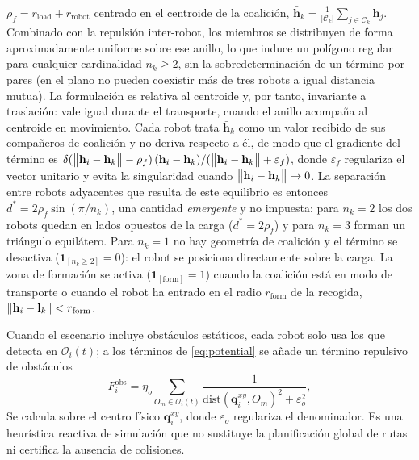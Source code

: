 $\rho_f = r_{\text{load}} + r_{\text{robot}}$ centrado en el centroide de la coalición,
$\bar{\mathbf{h}}_k = \tfrac{1}{|\mathcal{C}_k|}\sum_{j\in\mathcal{C}_k}\mathbf{h}_j$.
Combinado con la repulsión inter-robot, los miembros se distribuyen de forma
aproximadamente uniforme sobre ese anillo, lo que induce un polígono regular para
cualquier cardinalidad $n_k \geq 2$, sin la sobredeterminación de un término por pares
(en el plano no pueden coexistir más de tres robots a igual distancia mutua). La
formulación es relativa al centroide y, por tanto, invariante a traslación: vale igual
durante el transporte, cuando el anillo acompaña al centroide en movimiento. Cada robot
trata $\bar{\mathbf{h}}_k$ como un valor recibido de sus compañeros de coalición y no
deriva respecto a él, de modo que el gradiente del término es
$\delta(\left\|\mathbf{h}_i-\bar{\mathbf{h}}_k\right\|-\rho_f)\,(\mathbf{h}_i-\bar{\mathbf{h}}_k)
/(\left\|\mathbf{h}_i-\bar{\mathbf{h}}_k\right\|+\varepsilon_f)$, donde $\varepsilon_f$ regulariza
el vector unitario y evita la singularidad cuando
$\left\|\mathbf{h}_i-\bar{\mathbf{h}}_k\right\|\to 0$.
La separación entre robots adyacentes que resulta de este equilibrio es entonces
$d^* = 2\rho_f \sin(\pi/n_k)$, una cantidad \emph{emergente} y no impuesta: para
$n_k = 2$ los dos robots quedan en lados opuestos de la carga ($d^* = 2\rho_f$) y para
$n_k = 3$ forman un triángulo equilátero. Para $n_k = 1$ no hay geometría de coalición y
el término se desactiva ($\mathbf{1}_{[n_k\geq 2]}=0$): el robot se posiciona
directamente sobre la carga. La zona de formación se activa
($\mathbf{1}_{[\text{form}]}=1$) cuando la coalición está en modo de transporte o cuando
el robot ha entrado en el radio $r_{\text{form}}$ de la recogida,
$\left\|\mathbf{h}_i - \mathbf{l}_k\right\| < r_{\text{form}}$.

Cuando el escenario incluye obstáculos estáticos, cada robot solo usa los que detecta en
$\mathcal{O}_i(t)$; a los términos de \eqref{eq:potential} se añade un término
repulsivo de obstáculos
\begin{equation}
  F_i^{\mathrm{obs}} = \eta_o \sum_{O_m\in\mathcal{O}_i(t)}
    \frac{1}{\mathrm{dist}(\mathbf{q}_i^{xy}, O_m)^2 + \varepsilon_o^2},
  \label{eq:obstaculo}
\end{equation}
Se calcula sobre el centro físico $\mathbf{q}_i^{xy}$, donde $\varepsilon_o$ regulariza
el denominador. Es una heurística reactiva de simulación que no sustituye la
planificación global de rutas ni certifica la ausencia de colisiones.

